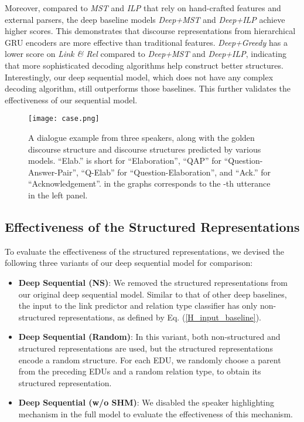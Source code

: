 \documentclass[letterpaper]{article} \usepackage{aaai19}  \usepackage{times}  \usepackage{helvet}  \usepackage{courier}  \usepackage{url}  \usepackage{graphicx}  \usepackage{amssymb}
\begin{document}
Moreover, compared to \emph{MST} and \emph{ILP} that rely on hand-crafted features and external parsers, the deep baseline models \emph{Deep+MST} and \emph{Deep+ILP} achieve higher  scores. This demonstrates that discourse representations from hierarchical GRU encoders are more effective than traditional features.
\emph{Deep+Greedy} has a lower  score on \emph{Link \& Rel} compared to \emph{Deep+MST} and \emph{Deep+ILP}, indicating that more sophisticated decoding algorithms help construct better structures. Interestingly, our deep sequential model, which does not have any complex decoding algorithm, still outperforms those baselines. This further validates the effectiveness of our sequential model.

\begin{figure*}[ht]
    \centering
    \texttt{[image: case.png]}  
    \caption{A dialogue example from three speakers, along with the golden discourse structure and discourse structures predicted by various models. ``Elab.'' is short for ``Elaboration'', ``QAP'' for ``Question-Answer-Pair'', ``Q-Elab'' for ``Question-Elaboration'', and ``Ack.'' for ``Acknowledgement''.  in the graphs corresponds to the -th utterance in the left panel.}
    \label{case}
\end{figure*}

\subsection{Effectiveness of the Structured Representations}

To evaluate the effectiveness of the structured representations, we devised the following three variants of our deep sequential model for comparison:

\begin{itemize}
    \item \textbf{Deep Sequential (NS)}:
    We removed the structured representations from our original deep sequential model.
    Similar to that of other deep baselines, the input to the link predictor and relation type classifier has only non-structured representations, as defined by Eq. (\ref{H_input_baseline}).
    
    \item \textbf{Deep Sequential (Random)}:
    In this variant, both non-structured and structured representations are used, but the structured representations encode a random structure. For each EDU, we randomly choose a parent from the preceding EDUs and a random relation type, to obtain its structured representation.
    
    \item \textbf{Deep Sequential (w/o SHM)}:
    We disabled the speaker highlighting mechanism in the full model to evaluate the effectiveness of this mechanism.
\end{itemize}
\end{document}
